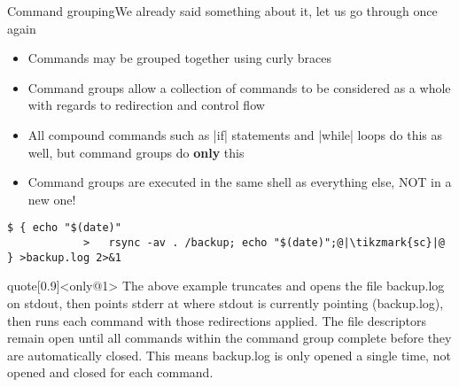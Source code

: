 \begin{frame}[fragile]{Command grouping}{We already said something about it, let us go through once again}
    \vspace{-4mm}
    \begin{overlayarea}{\textwidth}{0.7\textheight}
        \begin{itemize}
            \item Commands may be grouped together using curly braces \PB{\texttt{\{\ldots\}}}
            \item Command groups allow a collection of commands to be considered as a whole with regards to redirection and control flow
            \item All compound commands such as \bash|if| statements and \bash|while| loops do this as well, but command groups do \textbf{only} this
            \item Command groups are executed in the same shell as everything else, NOT in a new one!
        \end{itemize}
        \begin{lstlisting}[style=MyBash, numbers=none]
            $ { echo "$(date)"
            >   rsync -av . /backup; echo "$(date)";@|\tikzmark{sc}|@ } >backup.log 2>&1
        \end{lstlisting}
        \smallskip
        \begin{varblock}{quote}[0.9\textwidth]{}<only@1>
            The above example truncates and opens the file backup.log on stdout, then points stderr at where stdout is currently pointing (backup.log), then runs each command with those redirections applied.
            The file descriptors remain open until all commands within the command group complete before they are automatically closed.
            This means backup.log is only opened a single time, not opened and closed for each command.
        \end{varblock}
    \end{overlayarea}
\end{frame}
